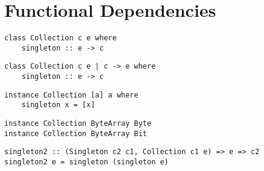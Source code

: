 \section{Functional Dependencies}

\begin{verbatim}
class Collection c e where
    singleton :: e -> c
\end{verbatim}

\begin{verbatim}
class Collection c e | c -> e where
    singleton :: e -> c
\end{verbatim}

\begin{verbatim}
instance Collection [a] a where
    singleton x = [x]
\end{verbatim}

\begin{verbatim}
instance Collection ByteArray Byte
instance Collection ByteArray Bit
\end{verbatim}

\begin{verbatim}
singleton2 :: (Singleton c2 c1, Collection c1 e) => e => c2
singleton2 e = singleton (singleton e)
\end{verbatim}
